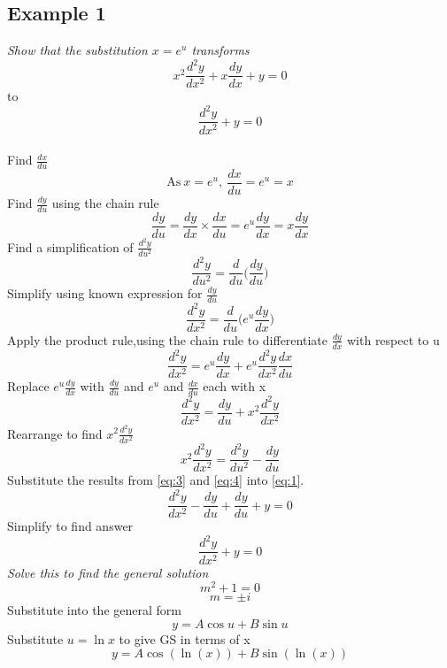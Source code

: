 \documentclass{article}[18pt]
\begin{document}
\subsection{Example 1}
\textit{Show that the substitution $x=e^u$ transforms}
\begin{equation}\label{eq:1}
x^2\frac{d^2y}{dx^2}+x\frac{dy}{dx}+y=0
\end{equation}
to
\begin{equation}\label{eq:2}
\frac{d^2y}{dx^2}+y=0
\end{equation}
\\
Find $\frac{dx}{du}$
$$\textrm{As} \ x=e^u, \ \frac{dx}{du}=e^u=x$$
Find $\frac{dy}{du}$ using the chain rule
\begin{equation}\label{eq:3}
\frac{dy}{du}=\frac{dy}{dx}\times\frac{dx}{du}=e^u\frac{dy}{dx}=x\frac{dy}{dx}
\end{equation}
Find a simplification of $\frac{d^2y}{du^2}$
$$\frac{d^2y}{du^2}=\frac{d}{du}\Bigg(\frac{dy}{du}\Bigg)$$
Simplify using known expression for $\frac{dy}{du}$
$$\frac{d^2y}{dx^2}=\frac{d}{du}\Bigg(e^u\frac{dy}{dx}\Bigg)$$
Apply the product rule,using the chain rule to differentiate $\frac{dy}{dx}$ with respect to u
$$\frac{d^2y}{dx^2}=e^u\frac{dy}{dx}+e^u\frac{d^2y}{dx^2}\frac{dx}{du}$$
Replace $e^u\frac{dy}{dx}$ with $\frac{dy}{du}$ and $e^u$ and $\frac{dx}{du}$ each with x
$$\frac{d^2y}{dx^2}=\frac{dy}{du}+x^2\frac{d^2y}{dx^2}$$
Rearrange to find $x^2\frac{d^2y}{dx^2}$
\begin{equation}\label{eq:4}
x^2\frac{d^2y}{dx^2}=\frac{d^2y}{du^2}-\frac{dy}{du}
\end{equation}
Substitute the results from \eqref{eq:3} and \eqref{eq:4} into \eqref{eq:1}.
$$\frac{d^2y}{dx^2}-\frac{dy}{du}+\frac{dy}{du}+y=0$$
Simplify to find answer
$$\frac{d^2y}{dx^2}+y=0$$
\textit{Solve this to find the general solution}
$$m^2+1=0$$
$$m=\pm i$$
Substitute into the general form
$$y=A\cos u+B\sin u$$
Substitute $u=\ln x$ to give GS in terms of x
$$y=A\cos(\ln(x))+B\sin(\ln(x))$$
\end{document}
